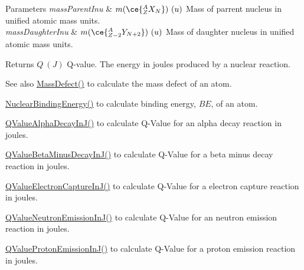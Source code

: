\begin{DoxyParams}{Parameters}
{\em mass\+Parent\+Inu} & $m(\ce{ ^{A}_{Z}X_{N} })\ (u)$ Mass of parrent nucleus in unified atomic mass units. \\
\hline
{\em mass\+Daughter\+Inu} & $m(\ce{ ^{A}_{Z -2}Y_{N +2} })\ (u)$ Mass of daughter nucleus in unified atomic mass units. \\
\hline
\end{DoxyParams}
\begin{DoxyReturn}{Returns}
$Q\ (J)$ Q-\/value. The energy in joules produced by a nuclear reaction. 
\end{DoxyReturn}
\begin{DoxySeeAlso}{See also}
\mbox{\hyperlink{group___e_g_x_phys-_mass_defect_gae89f2dfa65992c0314adc2440b2f582a}{Mass\+Defect()}} to calculate the mass defect of an atom. 

\mbox{\hyperlink{group___e_g_x_phys-_nuclear_binding_energy_gab6832bf15ead7b4e867e759e0a2a078e}{Nuclear\+Binding\+Energy()}} to calculate binding energy, $BE$, of an atom. 

\mbox{\hyperlink{group___e_g_x_phys-_q_value-_alpha_gab8a50c18f6de3c1b6ed280c26c3ff3a5}{Q\+Value\+Alpha\+Decay\+In\+J()}} to calculate Q-\/\+Value for an alpha decay reaction in joules. 

\mbox{\hyperlink{group___e_g_x_phys-_q_value-_beta_minus_gae9a4a9f4c6e0f555e20c3144dd7329fc}{Q\+Value\+Beta\+Minus\+Decay\+In\+J()}} to calculate Q-\/\+Value for a beta minus decay reaction in joules. 

\mbox{\hyperlink{group___e_g_x_phys-_q_value-_electron_capture_gaf2569f9c706130b730dcf55695780263}{Q\+Value\+Electron\+Capture\+In\+J()}} to calculate Q-\/\+Value for a electron capture reaction in joules. 

\mbox{\hyperlink{group___e_g_x_phys-_q_value-_neutron_emission_gacb17fa06731637937bc65765943d67ca}{Q\+Value\+Neutron\+Emission\+In\+J()}} to calculate Q-\/\+Value for an neutron emission reaction in joules. 

\mbox{\hyperlink{group___e_g_x_phys-_q_value-_proton_emission_ga41f19b0d9a2dc06e89de44aaa2d48d62}{Q\+Value\+Proton\+Emission\+In\+J()}} to calculate Q-\/\+Value for a proton emission reaction in joules. 
\end{DoxySeeAlso}
\mbox{\label{group___e_g_x_phys-_q_value-_beta_plus_gab78be314eac63ddbce441b4c8b22b47d}} 
